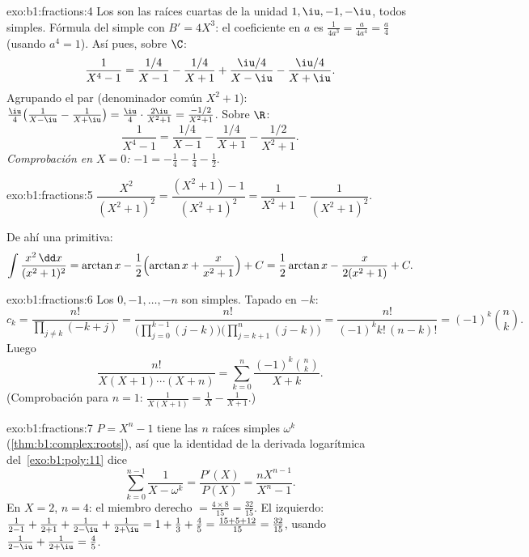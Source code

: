 \begin{solution}{exo:b1:fractions:4}
Los  son las raíces cuartas de la unidad $1, \iu, -1, -\iu$,
todos simples. Fórmula del  simple con $B' = 4X^3$: el coeficiente
en $a$ es $\frac{1}{4a^3} = \frac{a}{4a^4} = \frac a4$ (usando
$a^4 = 1$). Así pues, sobre $\C$:
\[
\frac{1}{X^4 - 1}
= \frac{1/4}{X - 1} - \frac{1/4}{X + 1}
+ \frac{\iu/4}{X - \iu} - \frac{\iu/4}{X + \iu} .
\]
Agrupando el par  (denominador común $X^2 + 1$):
$\frac{\iu}{4}\bigl(\frac{1}{X-\iu} - \frac{1}{X+\iu}\bigr) =
\frac{\iu}{4}\cdot\frac{2\iu}{X^2+1} = \frac{-1/2}{X^2+1}$. Sobre
$\R$:
\[
\frac{1}{X^4 - 1}
= \frac{1/4}{X-1} - \frac{1/4}{X+1} - \frac{1/2}{X^2 + 1} .
\]
\emph{Comprobación en $X = 0$:} $-1 = -\frac14 - \frac14 - \frac12$.
\end{solution}

\begin{solution}{exo:b1:fractions:5}
$\dfrac{X^2}{(X^2+1)^2} = \dfrac{(X^2 + 1) - 1}{(X^2+1)^2} =
\dfrac{1}{X^2+1} - \dfrac{1}{(X^2+1)^2}$.

De ahí una primitiva:
\[
\int \frac{x^2\,\dd x}{(x^2+1)^2}
= \arctan x - \frac12\Bigl(\arctan x + \frac{x}{x^2+1}\Bigr) + C
= \frac12\arctan x - \frac{x}{2(x^2+1)} + C .
\]
\end{solution}

\begin{solution}{exo:b1:fractions:6}
Los  $0, -1, \dots, -n$ son simples. Tapado en $-k$:
\[
c_k = \frac{n!}{\prod_{j \neq k} (-k + j)}
= \frac{n!}{\bigl(\prod_{j=0}^{k-1}(j - k)\bigr)
\bigl(\prod_{j=k+1}^{n}(j-k)\bigr)}
= \frac{n!}{(-1)^k k!\,(n-k)!} = (-1)^k \binom nk .
\]
Luego
\[
\frac{n!}{X(X+1)\cdots(X+n)}
= \sum_{k=0}^{n} \frac{(-1)^k \binom nk}{X + k} .
\]
(Comprobación para $n = 1$: $\frac{1}{X(X+1)} = \frac1X -
\frac{1}{X+1}$.)
\end{solution}

\begin{solution}{exo:b1:fractions:7}
$P = X^n - 1$ tiene las $n$ raíces simples $\omega^k$
(\cref{thm:b1:complex:roots}), así que la identidad de la derivada
logarítmica del~\cref{exo:b1:poly:11} dice
\[
\sum_{k=0}^{n-1} \frac{1}{X - \omega^k}
= \frac{P'(X)}{P(X)} = \frac{n X^{n-1}}{X^n - 1} .
\]
En $X = 2$, $n = 4$: el miembro derecho
$= \frac{4 \times 8}{15} = \frac{32}{15}$. El izquierdo:
$\frac{1}{2-1} + \frac{1}{2+1} + \frac{1}{2 - \iu} + \frac{1}{2 + \iu}
= 1 + \frac13 + \frac{4}{5} = \frac{15 + 5 + 12}{15} = \frac{32}{15}$,
usando $\frac{1}{2-\iu} + \frac{1}{2+\iu} = \frac{4}{5}$.
\end{solution}

